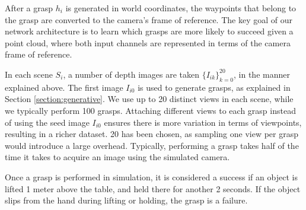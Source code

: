 After a grasp $h_i$ is generated in world coordinates, the waypoints that belong to the grasp are converted to the camera's frame of reference. The key goal of our network architecture is to learn which grasps are more likely to succeed given a point cloud, where both input channels are represented in terms of the camera frame of reference. %

In each scene $S_i$, a number of depth images are taken $\{I_{ik}\}_{k=0}^20$, in the manner explained above. The first image $I_{i0}$ is used to generate grasps, as explained in Section \ref{section:generative}. We use up to 20 distinct views in each scene, while we typically perform 100 grasps. Attaching different views to each grasp instead of using the seed image $I_{i0}$ ensures there is more variation in terms of viewpoints, resulting in a richer dataset. 20 has been chosen, as sampling one view per grasp would introduce a large overhead. Typically, performing a grasp takes half of the time it takes to acquire an image using the simulated camera.

Once a grasp is performed in simulation, it is considered a success if an object is lifted 1 meter above the table, and held there for another 2 seconds. If the object slips from the hand during lifting or holding, the grasp is a failure. 



